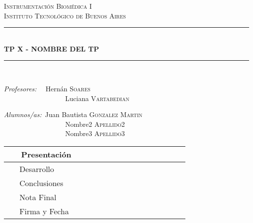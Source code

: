\documentclass[10pt]{article}
\newcommand{\HRule}{\rule{\linewidth}{0.5mm}}
\begin{document}
\begin{center}

\textsc{\LARGE Instrumentación Biomédica I}\\[0.2cm]
\textsc{\Large Instituto Tecnológico de Buenos Aires}\\[0.2cm]

\HRule \\[0.2cm]
{ \huge \bfseries  TP X - NOMBRE DEL TP \\[0.2cm] }
\HRule \\[1cm]

\begin{multicols}{2}

{\raggedright{}
\large
\emph{Profesores:} \ \  Hernán   \textsc{Soares}\\
\ \ \ \ \ \ \ \ \ \ \ \ \ \ \ \ \ \  Luciana \textsc{Vartabedian} \\
}

\columnbreak
{\raggedright{}
\large
\emph{Alumnos/as:}\  Juan Bautista  \textsc{Gonzalez Martin} \\
\ \ \ \ \ \ \ \ \ \ \ \ \ \ \ \ \ \ Nombre2  \textsc{Apellido2}\\
\  \ \ \ \ \ \ \ \ \ \ \ \ \ \ \ \ \ Nombre3  \textsc{Apellido3}\\
}
\end {multicols}

\vspace{0.5cm}

\begin{adjustbox}{max width=\textwidth}

\tabulinesep=1.8mm

  \begin{tabu}{|  l | c |}
    \hline
     \ \ \ Presentación  &       \ \ \  \ \ \  \ \ \   \ \ \ \ \ \  \\ \hline
     \ \ \ Desarrollo &  \\ \hline
     \ \ \ Conclusiones &   \\ \hline
    \ \ \  Nota Final &  \\ \hline \hline
     \ \ \  Firma y Fecha  \ \ \ \ \ \ \ \ \ &   \\
    \hline
  \end{tabu}
\end{adjustbox}

\end{center}
\end{document}
